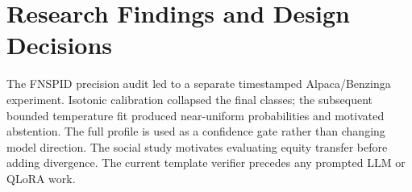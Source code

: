 \section{Research Findings and Design Decisions}
The FNSPID precision audit led to a separate timestamped Alpaca/Benzinga experiment. Isotonic calibration collapsed the final classes; the subsequent bounded temperature fit produced near-uniform probabilities and motivated abstention. The full profile is used as a confidence gate rather than changing model direction. The social study motivates evaluating equity transfer before adding divergence. The current template verifier precedes any prompted LLM or QLoRA work\cite{qlora_2023,phi3_2024}.


